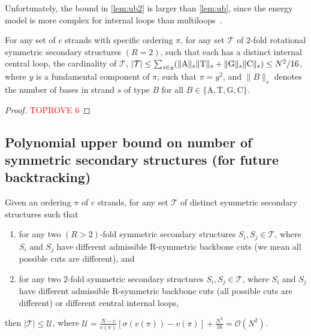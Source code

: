 Unfortunately, the bound in \cref{lem:ub2} is larger than \cref{lem:ub}, since the energy model is more complex for internal loops than multiloops~\cite{dirks2003partition}. 

\begin{lemma}\label{lem:ub2}
	For any set of $c$ strands with specific ordering $\pi$, for any set $\mathcal{T}$ of $2$-fold rotational symmetric secondary structures $(R=2)$, 
	such that each has a distinct internal central loop, the  cardinality of $\mathcal{T}$, $ |\mathcal{T}| \leq \sum_{s\in y} (\lVert \mathrm{A} \rVert_s \lVert \mathrm{T} \rVert_s+ \lVert \mathrm{G} \rVert_s \lVert \mathrm{C} \rVert_s ) \leq N^2/16$, 
	where $y$ is a fundamental component of $\pi$, such that $\pi = y^2$, and $\parallel\! \! B \!\! \parallel_s$  
	denotes the number of bases in strand $s$ of type $B$ for all $B\in\{\mathrm{A},\mathrm{T},\mathrm{G},\mathrm{C}\}$.
\end{lemma} 

\begin{proof}\textcolor{red}{TOPROVE 6}\end{proof}









\subsection{Polynomial upper bound on number of symmetric secondary structures (for future backtracking)}
\begin{lemma}\label{lem:polyub}
	
	Given an ordering $\pi$ of $c$ strands, 
	for any set $\mathcal{T}$ of distinct symmetric secondary structures such that 
	\begin{enumerate}
		\item  for any two $(R>2)$-fold symmetric secondary structures $S_i, S_j \in \mathcal{T}$, where $S_i$ and $S_j$ have different admissible R-symmetric backbone cuts (we mean all possible cuts are different), 	
		and 
		\item 
		for any two 2-fold symmetric secondary structures $S_i, S_j \in \mathcal{T}$, where $S_i$ and $S_j$ have different admissible R-symmetric backbone cuts (all possible cuts are different)
		or  different central internal loops, 
	\end{enumerate}
	then $|\mathcal{T}| \leq \mathcal{U}$, where $\mathcal{U} =  \frac{N-c}{v(\pi)} \left[ \sigma(v(\pi))-v(\pi) \right] + \frac{N^2}{16} = \mathcal{O}(N^2)$. 
\end{lemma}

